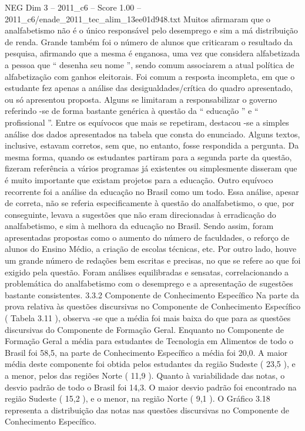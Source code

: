 \begin{textsample}{NEG Dim 3 – 2011\_c6 – Score 1.00 – 2011\_c6/enade\_2011\_tec\_alim\_13ee01d948.txt}
Muitos afirmaram que o analfabetismo não é o único responsável pelo desemprego e sim a má distribuição de renda.
Grande também foi o número de alunos que criticaram o resultado da pesquisa, afirmando que a mesma é enganosa, uma vez que considera alfabetizada a pessoa que “ desenha seu nome ”, sendo comum associarem a atual política de alfabetização com ganhos eleitorais.
Foi comum a resposta incompleta, em que o estudante fez apenas a análise das desigualdades/crítica do quadro apresentado, ou só apresentou proposta.
Alguns se limitaram a responsabilizar o governo referindo -se de forma bastante genérica à questão da “ educação ” e “ profissional ”.
Entre os equívocos que mais se repetiram, destacou -se a simples análise dos dados apresentados na tabela que consta do enunciado.
Alguns textos, inclusive, estavam corretos, sem que, no entanto, fosse respondida a pergunta.
Da mesma forma, quando os estudantes partiram para a segunda parte da questão, fizeram referência a vários programas já existentes ou simplesmente disseram que é muito importante que existam projetos para a educação.
Outro equívoco recorrente foi a análise da educação no Brasil como um todo.
Essa análise, apesar de correta, não se referia especificamente à questão do analfabetismo, o que, por conseguinte, levava a sugestões que não eram direcionadas à erradicação do analfabetismo, e sim à melhora da educação no Brasil.
Sendo assim, foram apresentadas propostas como o aumento do número de faculdades, o reforço de alunos do Ensino Médio, a criação de escolas técnicas, etc.
Por outro lado, houve um grande número de redações bem escritas e precisas, no que se refere ao que foi exigido pela questão.
Foram análises equilibradas e sensatas, correlacionando a problemática do analfabetismo com o desemprego e a apresentação de sugestões bastante consistentes. 3.3.2 Componente de Conhecimento Específico Na parte da prova relativa às questões discursivas no Componente de Conhecimento Específico ( Tabela 3.11 ), observa -se que a média foi mais baixa do que para as questões discursivas do Componente de Formação Geral.
Enquanto no Componente de Formação Geral a média para estudantes de Tecnologia em Alimentos de todo o Brasil foi 58,5, na parte de Conhecimento Específico a média foi 20,0.
A maior média deste componente foi obtida pelos estudantes da região Sudeste ( 23,5 ), e a menor, pelos das regiões Norte ( 11,9 ).
Quanto à variabilidade das notas, o desvio padrão de todo o Brasil foi 14,3.
O maior desvio padrão foi encontrado na região Sudeste ( 15,2 ), e o menor, na região Norte ( 9,1 ).
O Gráfico 3.18 representa a distribuição das notas nas questões discursivas no Componente de Conhecimento Específico.

\end{textsample}
